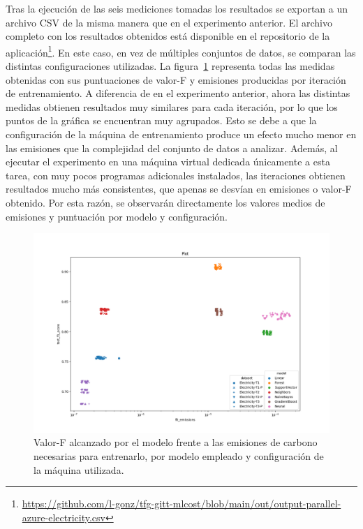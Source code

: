 Tras la ejecución de las seis mediciones tomadas los resultados se exportan a un archivo CSV de la misma manera que en el experimento anterior. El archivo completo con los resultados obtenidos está disponible en el repositorio de la aplicación\footnote{\url{https://github.com/l-gonz/tfg-gitt-mlcost/blob/main/out/output-parallel-azure-electricity.csv}}. En este caso, en vez de múltiples conjuntos de datos, se comparan las distintas configuraciones utilizadas. La figura~\ref{fig:4-2-non-average-scatter} representa todas las medidas obtenidas con sus puntuaciones de valor-F y emisiones producidas por iteración de entrenamiento. A diferencia de en el experimento anterior, ahora las distintas medidas obtienen resultados muy similares para cada iteración, por lo que los puntos de la gráfica se encuentran muy agrupados. Esto se debe a que la configuración de la máquina de entrenamiento produce un efecto mucho menor en las emisiones que la complejidad del conjunto de datos a analizar. Además, al ejecutar el experimento en una máquina virtual dedicada únicamente a esta tarea, con muy pocos programas adicionales instalados, las iteraciones obtienen resultados mucho más consistentes, que apenas se desvían en emisiones o valor-F obtenido. Por esta razón, se observarán directamente los valores medios de emisiones y puntuación por modelo y configuración.

\begin{figure}[H]
  \centerline{
     \includegraphics[width=\textwidth, keepaspectratio]{img/graph/2-scat-emissions-non-average.png}
  }
  \caption{Valor-F alcanzado por el modelo frente a las emisiones de carbono necesarias para entrenarlo, por modelo empleado y configuración de la máquina utilizada.}
  \label{fig:4-2-non-average-scatter}
\end{figure}


